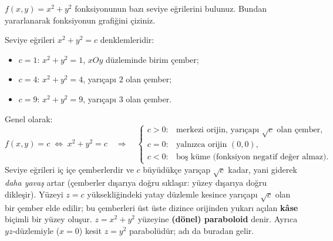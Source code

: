 \begin{soru}
$f(x,y)=x^2+y^2$ fonksiyonunun bazı seviye eğrilerini bulunuz. Bundan yararlanarak fonksiyonun grafiğini çiziniz.
\end{soru}
\begin{cevap}
Seviye eğrileri $x^2+y^2=c$ denklemleridir:
\begin{itemize}
  \item $c=1$: $x^2+y^2=1$, $xOy$ düzleminde birim çember;
  \item $c=4$: $x^2+y^2=4$, yarıçapı $2$ olan çember;
  \item $c=9$: $x^2+y^2=9$, yarıçapı $3$ olan çember.
\end{itemize}
Genel olarak:
\[
f(x,y)=c \;\Longleftrightarrow\; x^2+y^2=c \quad\Rightarrow\quad
\begin{cases}
c>0: & \text{merkezi orijin, yarıçapı } \sqrt c \text{ olan çember},\\
c=0: & \text{yalnızca orijin } (0,0),\\
c<0: & \text{boş küme (fonksiyon negatif değer almaz)}.
\end{cases}
\]
Seviye eğrileri iç içe çemberlerdir ve $c$ büyüdükçe yarıçap $\sqrt c$ kadar, yani giderek \emph{daha yavaş} artar
(çemberler dışarıya doğru sıklaşır: yüzey dışarıya doğru dikleşir). Yüzeyi $z=c$ yüksekliğindeki yatay düzlemle kesince
yarıçapı $\sqrt c$ olan bir çember elde edilir; bu çemberleri üst üste dizince orijinden yukarı açılan \textbf{kâse}
biçimli bir yüzey oluşur. $z=x^2+y^2$ yüzeyine \textbf{(dönel) paraboloid} denir. Ayrıca $yz$-düzlemiyle ($x=0$) kesit
$z=y^2$ parabolüdür; adı da buradan gelir.
\end{cevap}

